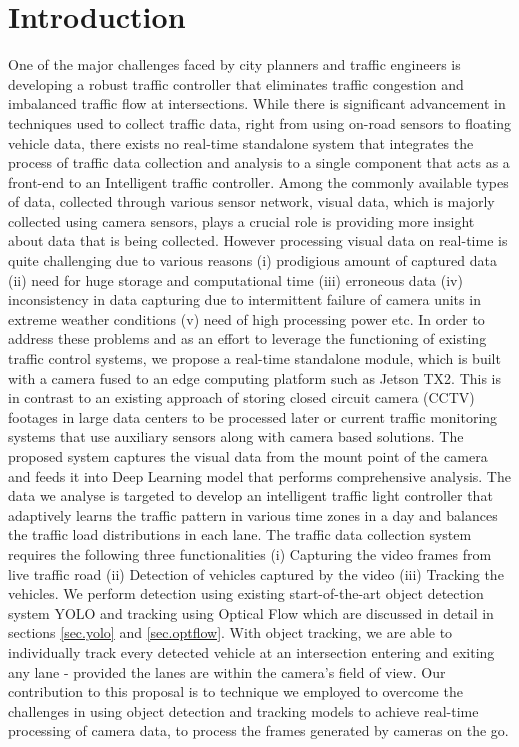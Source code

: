 \documentclass[conference]{IEEEtran}
\begin{document}
\section{Introduction}
One of the major challenges faced by city planners and traffic engineers is developing a robust traffic controller that eliminates traffic congestion and imbalanced traffic flow at intersections. 
While there is significant advancement in techniques used to collect traffic data, right from using on-road sensors to floating vehicle data, there exists no real-time standalone system that integrates the process of traffic data collection and analysis to a single component that acts as a front-end to an Intelligent traffic controller. 
Among the commonly available types of data, collected through various sensor network, visual data, which is majorly collected using camera sensors, plays a crucial role is providing more insight about data that is being collected. 
However processing visual data on real-time is quite challenging due to various reasons (i) prodigious amount of captured data (ii) need for huge storage and computational time (iii) erroneous data (iv) inconsistency in data capturing due to intermittent failure of camera units in extreme weather conditions (v) need of high processing power etc.
In order to address these problems and as an effort to leverage the functioning of existing traffic control systems, we propose a real-time standalone module,  which is built with a camera fused to an edge computing platform such as Jetson TX2.
This is in contrast to an existing approach of storing closed circuit camera (CCTV) footages in large data centers to be processed later or current traffic monitoring systems that use auxiliary sensors along with camera based solutions. 
The proposed system captures the visual data from the mount point of the camera and feeds it into Deep Learning model that performs comprehensive analysis.
The data we analyse is targeted to develop an intelligent traffic light controller that adaptively learns the traffic pattern in various time zones in a day and balances the traffic load distributions in each lane.   
The traffic data collection system requires the following three functionalities (i) Capturing the video frames from live traffic road (ii) Detection of vehicles captured by the video (iii) Tracking the vehicles. 
We perform detection using existing start-of-the-art object detection system YOLO \cite{YOLO_v1, YOLO_v2} and tracking using Optical Flow \cite{perf_optical_flow} which are discussed in detail in sections \ref{sec.yolo} and \ref{sec.optflow}. 
With object tracking, we are able to individually track every detected vehicle at an intersection entering and exiting any lane - provided the lanes are within the camera's field of view.
Our contribution to this proposal is to technique we employed to overcome the challenges in using object detection and tracking models to achieve real-time processing of camera data, to process the frames generated by cameras on the go.
\end{document}
